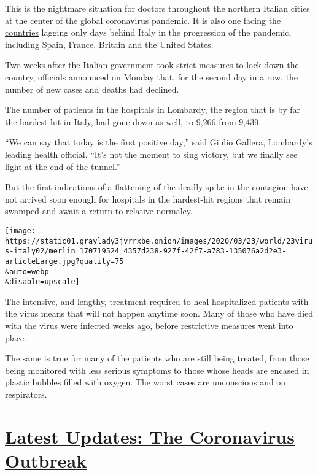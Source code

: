 This is the nightmare situation for doctors throughout the northern
Italian cities at the center of the global coronavirus pandemic. It is
also
\href{https://www.nytimes3xbfgragh.onion/2020/03/21/us/coronavirus-medical-rationing.html}{one
facing the countries} lagging only days behind Italy in the progression
of the pandemic, including Spain, France, Britain and the United States.

Two weeks after the Italian government took strict measures to lock down
the country, officials announced on Monday that, for the second day in a
row, the number of new cases and deaths had declined.

The number of patients in the hospitals in Lombardy, the region that is
by far the hardest hit in Italy, had gone down as well, to 9,266 from
9,439.

``We can say that today is the first positive day,'' said Giulio
Gallera, Lombardy's leading health official. ``It's not the moment to
sing victory, but we finally see light at the end of the tunnel.''

But the first indications of a flattening of the deadly spike in the
contagion have not arrived soon enough for hospitals in the hardest-hit
regions that remain swamped and await a return to relative normalcy.

\texttt{[image: https://static01.graylady3jvrrxbe.onion/images/2020/03/23/world/23virus-italy02/merlin\_170719524\_4357d238-927f-42f7-a783-135076a2d2e3-articleLarge.jpg?quality=75\\\&auto=webp\\\&disable=upscale]}

The intensive, and lengthy, treatment required to heal hospitalized
patients with the virus means that will not happen anytime soon. Many of
those who have died with the virus were infected weeks ago, before
restrictive measures went into place.

The same is true for many of the patients who are still being treated,
from those being monitored with less serious symptoms to those whose
heads are encased in plastic bubbles filled with oxygen. The worst cases
are unconscious and on respirators.

\hypertarget{latest-updates-the-coronavirus-outbreak}{%
\section{\texorpdfstring{\href{https://www.nytimes3xbfgragh.onion/2020/09/04/world/covid-19-coronavirus.html?action=click\&pgtype=Article\&state=default\&region=MAIN_CONTENT_1\&context=storylines_live_updates}{Latest
Updates: The Coronavirus
Outbreak}}{Latest Updates: The Coronavirus Outbreak}}\label{latest-updates-the-coronavirus-outbreak}}

